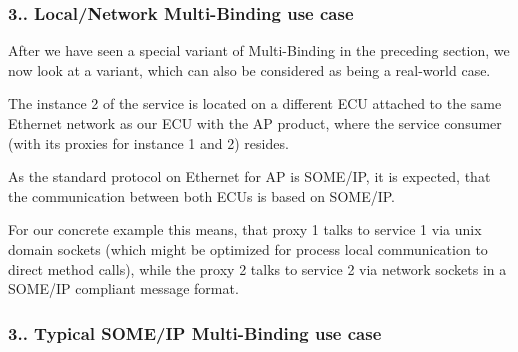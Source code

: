 \subsubsection*{3.. Local/\+Network Multi-\/\+Binding use case}


\begin{DoxyItemize}
\item After we have seen a special variant of Multi-\/\+Binding in the preceding section, we now look at a variant, which can also be considered as being a real-\/world case.
\item The instance 2 of the service is located on a different E\+CU attached to the same Ethernet network as our E\+CU with the AP product, where the service consumer (with its proxies for instance 1 and 2) resides.
\item As the standard protocol on Ethernet for AP is S\+O\+M\+E/\+IP, it is expected, that the communication between both E\+C\+Us is based on S\+O\+M\+E/\+IP.
\item For our concrete example this means, that proxy 1 talks to service 1 via unix domain sockets (which might be optimized for process local communication to direct method calls), while the proxy 2 talks to service 2 via network sockets in a S\+O\+M\+E/\+IP compliant message format. 
\end{DoxyItemize}

\subsubsection*{3.. Typical S\+O\+M\+E/\+IP Multi-\/\+Binding use case}


